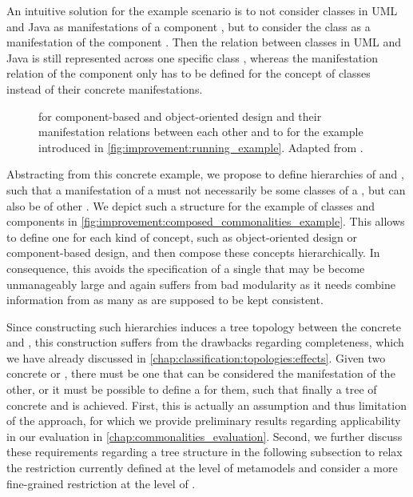 An intuitive solution for the example scenario is to not consider classes in \gls{UML} and Java as manifestations of a component \commonality, but to consider the class \commonality as a manifestation of the component \commonality.
Then the relation between classes in \gls{UML} and Java is still represented across one specific class \commonality, whereas the manifestation relation of the component \commonality only has to be defined for the concept of classes instead of their concrete manifestations.

\begin{figure}
    \centering
    
    \caption[Hierarchic composition of \conceptmetamodels]{\Conceptmetamodels for component-based and object-oriented design and their manifestation relations between each other and to \concretemetamodels for the example introduced in \autoref{fig:improvement:running_example}. Adapted from .}
    \label{fig:improvement:composed_commonalities_example}
\end{figure}

Abstracting from this concrete example, we propose to define hierarchies of \commonalities and \conceptmetamodels, such that a manifestation of a \commonality must not necessarily be some classes of a \concretemetamodel, but can also be \commonalities of other \conceptmetamodels.
We depict such a structure for the example of classes and components in \autoref{fig:improvement:composed_commonalities_example}.
This allows to define one \conceptmetamodel for each kind of concept, such as object-oriented design or component-based design, and then compose these concepts hierarchically.
In consequence, this avoids the specification of a single \conceptmetamodel that may be become unmanageably large and again suffers from bad modularity as it needs combine information from as many \concretemetamodels as are supposed to be kept consistent.

Since constructing such hierarchies induces a tree topology between the concrete and \conceptmetamodels, this construction suffers from the drawbacks regarding completeness, which we have already discussed in \autoref{chap:classification:topologies:effects}.
Given two concrete or \conceptmetamodels, there must be one that can be considered the manifestation of the other, or it must be possible to define a \conceptmetamodel for them, such that finally a tree of concrete and \conceptmetamodels is achieved.
First, this is actually an assumption and thus limitation of the approach, for which we provide preliminary results regarding applicability in our evaluation in \autoref{chap:commonalities_evaluation}.
Second, we further discuss these requirements regarding a tree structure in the following subsection to relax the restriction currently defined at the level of metamodels and consider a more fine-grained restriction at the level of \metaclasses.


